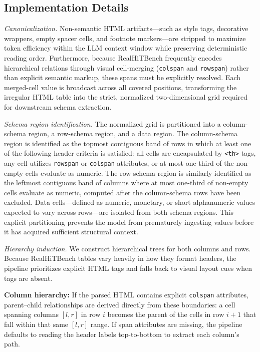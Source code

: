 ﻿\documentclass[a4paper]{article}
\begin{document}
\subsection{Implementation Details}

\textit{Canonicalization.} Non-semantic HTML artifacts—such as style tags, decorative wrappers, empty spacer cells, and footnote markers—are stripped to maximize token efficiency within the LLM context window while preserving deterministic reading order. Furthermore, because RealHiTBench frequently encodes hierarchical relations through visual cell-merging (\texttt{colspan} and \texttt{rowspan}) rather than explicit semantic markup, these spans must be explicitly resolved. Each merged-cell value is broadcast across all covered positions, transforming the irregular HTML table into the strict, normalized two-dimensional grid required for downstream schema extraction.

\textit{Schema region identification.} The normalized grid is partitioned into a column-schema region, a row-schema region, and a data region. The column-schema region is identified as the topmost contiguous band of rows in which at least one of the following header criteria is satisfied: all cells are encapsulated by \texttt{<th>} tags, any cell utilizes \texttt{rowspan} or \texttt{colspan} attributes, or at most one-third of the non-empty cells evaluate as numeric. The row-schema region is similarly identified as the leftmost contiguous band of columns where at most one-third of non-empty cells evaluate as numeric, computed after the column-schema rows have been excluded. Data cells---defined as numeric, monetary, or short alphanumeric values expected to vary across rows---are isolated from both schema regions. This explicit partitioning prevents the model from prematurely ingesting values before it has acquired sufficient structural context.

\textit{Hierarchy induction.} We construct hierarchical trees for both columns and rows. Because RealHiTBench tables vary heavily in how they format headers, the pipeline prioritizes explicit HTML tags and falls back to visual layout cues when tags are absent.

\textbf{Column hierarchy:} If the parsed HTML contains explicit \texttt{colspan} attributes, parent--child relationships are derived directly from these boundaries: a cell spanning columns $[l, r]$ in row $i$ becomes the parent of the cells in row $i{+}1$ that fall within that same $[l, r]$ range. If span attributes are missing, the pipeline defaults to reading the header labels top-to-bottom to extract each column's path.
\end{document}
